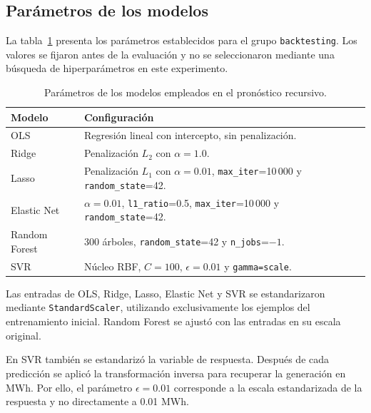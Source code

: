 \subsection{Parámetros de los modelos}

La tabla~\ref{tab:parametros-recursivos} presenta los parámetros establecidos para el grupo \texttt{backtesting}. Los valores se fijaron antes de la evaluación y no se seleccionaron mediante una búsqueda de hiperparámetros en este experimento.

\begin{table}[htbp]
    \centering
    \caption{Parámetros de los modelos empleados en el pronóstico recursivo.}
    \label{tab:parametros-recursivos}
    \begin{tabular}{p{}p{}}
        \toprule
        Modelo & Configuración \\
        \midrule
        OLS &
        Regresión lineal con intercepto, sin penalización. \\

        Ridge &
        Penalización $L_2$ con $\alpha=1.0$. \\

        Lasso &
        Penalización $L_1$ con $\alpha=0.01$,
        \texttt{max\_iter}=10\,000 y
        \texttt{random\_state}=42. \\

        Elastic Net &
        $\alpha=0.01$, \texttt{l1\_ratio}=0.5,
        \texttt{max\_iter}=10\,000 y
        \texttt{random\_state}=42. \\

        Random Forest &
        300 árboles, \texttt{random\_state}=42 y
        \texttt{n\_jobs}=$-1$. \\

        SVR &
        Núcleo RBF, $C=100$, $\epsilon=0.01$ y
        \texttt{gamma=scale}. \\
        \bottomrule
    \end{tabular}
\end{table}

Las entradas de OLS, Ridge, Lasso, Elastic Net y SVR se estandarizaron mediante \texttt{StandardScaler}, utilizando exclusivamente los ejemplos del entrenamiento inicial. Random Forest se ajustó con las entradas en su escala original.

En SVR también se estandarizó la variable de respuesta. Después de cada predicción se aplicó la transformación inversa para recuperar la generación en MWh. Por ello, el parámetro $\epsilon=0.01$ corresponde a la escala estandarizada de la respuesta y no directamente a 0.01 MWh.

